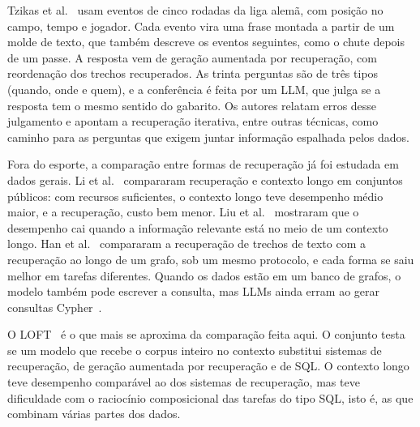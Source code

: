 Tzikas et al.~\cite{tzikas2025dynamic} usam eventos de cinco rodadas da liga alemã, com posição no campo, tempo e
jogador. Cada evento vira uma frase montada a partir de um molde de texto, que também descreve os
eventos seguintes, como o chute depois de um passe. A resposta vem de geração aumentada por recuperação, com reordenação dos trechos recuperados. As trinta perguntas são de três tipos (quando,
onde e quem), e a conferência é feita por um LLM, que julga se a resposta tem o mesmo sentido do gabarito. Os
autores relatam erros desse julgamento e apontam a recuperação iterativa, entre outras técnicas, como caminho
para as perguntas que exigem juntar informação espalhada pelos dados.

Fora do esporte, a comparação entre formas de recuperação já foi estudada em dados gerais.
Li et al.~\cite{li2024ragorlongcontext} compararam recuperação e contexto longo em conjuntos públicos: com
recursos suficientes, o contexto longo teve desempenho médio maior, e a recuperação, custo bem menor. Liu
et al.~\cite{liu2024lostinthemiddle} mostraram que o desempenho cai quando a informação relevante está no meio de
um contexto longo. Han et al.~\cite{han2025ragvsgraphrag} compararam a recuperação de trechos de texto com a
recuperação ao longo de um grafo, sob um mesmo protocolo, e cada forma se saiu melhor em tarefas diferentes.
Quando os dados estão em um banco de grafos, o modelo também pode escrever a consulta, mas LLMs ainda erram ao
gerar consultas Cypher~\cite{ozsoy2025text2cypher}.

O LOFT~\cite{lee2024loft} é o que mais se aproxima da comparação feita aqui. O conjunto testa se um modelo que
recebe o corpus inteiro no contexto substitui sistemas de recuperação, de geração aumentada por recuperação e de
SQL. O contexto longo teve desempenho comparável ao dos sistemas de recuperação, mas teve dificuldade com o
raciocínio composicional das tarefas do tipo SQL, isto é, as que combinam várias partes dos dados.

